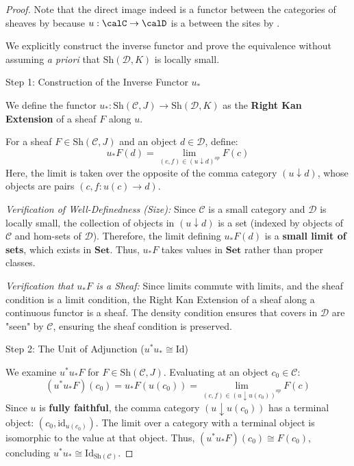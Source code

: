 \begin{proof}
    Note that the direct image indeed is a functor between the categories of sheaves by  because $u: \calC \to \calD$ is a  between the sites by .  

We explicitly construct the inverse functor and prove the equivalence without assuming \textit{a priori} that $\text{Sh}(\mathcal{D}, K)$ is locally small.

Step 1: Construction of the Inverse Functor $u_*$

We define the functor $u_*: \text{Sh}(\mathcal{C}, J) \to \text{Sh}(\mathcal{D}, K)$ as the \textbf{Right Kan Extension} of a sheaf $F$ along $u$.

For a sheaf $F \in \text{Sh}(\mathcal{C}, J)$ and an object $d \in \mathcal{D}$, define:
\[ u_*F(d) = \lim_{(c, f) \in (u \downarrow d)^{op}} F(c) \]
Here, the limit is taken over the opposite of the comma category $(u \downarrow d)$, whose objects are pairs $(c, f: u(c) \to d)$.

\textit{Verification of Well-Definedness (Size):} Since $\mathcal{C}$ is a small category and $\mathcal{D}$ is locally small, the collection of objects in $(u \downarrow d)$ is a set (indexed by objects of $\mathcal{C}$ and hom-sets of $\mathcal{D}$). Therefore, the limit defining $u_*F(d)$ is a \textbf{small limit of sets}, which exists in $\mathbf{Set}$. Thus, $u_*F$ takes values in $\mathbf{Set}$ rather than proper classes.

\textit{Verification that $u_*F$ is a Sheaf:} Since limits commute with limits, and the sheaf condition is a limit condition, the Right Kan Extension of a sheaf along a continuous functor is a sheaf. The density condition ensures that covers in $\mathcal{D}$ are "seen" by $\mathcal{C}$, ensuring the sheaf condition is preserved.

Step 2: The Unit of Adjunction ($u^* u_* \cong \text{Id}$)

We examine $u^* u_* F$ for $F \in \text{Sh}(\mathcal{C}, J)$. Evaluating at an object $c_0 \in \mathcal{C}$:
\[ (u^* u_* F)(c_0) = u_*F(u(c_0)) = \lim_{(c, f) \in (u \downarrow u(c_0))^{op}} F(c) \]
Since $u$ is \textbf{fully faithful}, the comma category $(u \downarrow u(c_0))$ has a terminal object: $(c_0, \text{id}_{u(c_0)})$. The limit over a category with a terminal object is isomorphic to the value at that object. Thus, $(u^* u_* F)(c_0) \cong F(c_0)$, concluding $u^* u_* \cong \text{Id}_{\text{Sh}(\mathcal{C})}$.


\end{proof}
